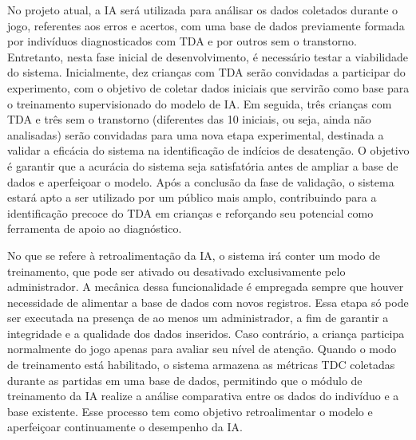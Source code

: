 No projeto atual, a IA será utilizada para análisar os dados coletados durante o jogo, referentes aos erros e acertos, com uma base de dados previamente formada por indivíduos diagnosticados com TDA e por outros sem o transtorno. Entretanto, nesta fase inicial de desenvolvimento, é necessário testar a viabilidade do sistema. Inicialmente, dez crianças com TDA serão convidadas a participar do experimento, com o objetivo de coletar dados iniciais que servirão como base para o treinamento supervisionado do modelo de IA. Em seguida, três crianças com TDA e três sem o transtorno (diferentes das 10 iniciais, ou seja, ainda não analisadas) 
serão convidadas para uma nova etapa experimental, destinada a validar a eficácia do sistema na identificação de indícios de desatenção. O objetivo é garantir que a acurácia do sistema seja satisfatória antes de ampliar a base de dados e aperfeiçoar o modelo. Após a conclusão da fase de validação, o sistema estará apto a ser utilizado por um público mais amplo, contribuindo para a identificação precoce do TDA em crianças e reforçando seu potencial como ferramenta de apoio ao diagnóstico. 

No que se refere à retroalimentação da IA, o sistema irá conter um modo de treinamento, que pode ser ativado ou desativado exclusivamente pelo administrador. A mecânica dessa funcionalidade é empregada sempre que houver necessidade de alimentar a base de dados com novos registros. Essa etapa só pode ser executada na presença de ao menos um administrador, a fim de garantir a integridade e a qualidade dos dados inseridos. Caso contrário, a criança participa normalmente do jogo apenas para avaliar seu nível de atenção. Quando o modo de treinamento está habilitado, o sistema armazena as métricas TDC coletadas durante as partidas em uma base de dados, permitindo que o módulo de treinamento da IA realize a análise comparativa entre os dados do indivíduo e a base existente. Esse processo tem como objetivo retroalimentar o modelo e aperfeiçoar continuamente o desempenho da IA. 
